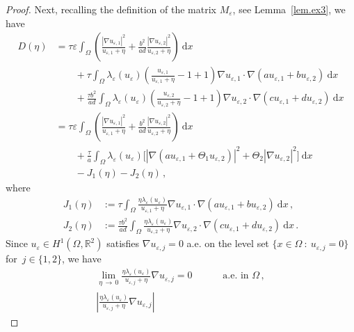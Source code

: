 \documentclass[10pt]{amsart}
\theoremstyle{definition}\newtheorem{defi}[theo]{Definition}\newtheorem{rema}[theo]{Remark}\newtheorem{exam}[theo]{Example}\newtheorem{exem}[theo]{Example}\newtheorem{nota}[theo]{Notation}
\newcommand{\bbR}{\mathbb{R}}
\newcommand{\rmd}{\mathrm{d}}
\begin{document}
\begin{proof}
Next, recalling the definition of the matrix $M_\varepsilon$, see Lemma~\ref{lem.ex3}, we have
\begin{align*}
D(\eta) & = \tau\varepsilon\int_\Omega
\left(\frac{|\nabla u_{\varepsilon,1}|^2}{u_{\varepsilon,1}+\eta} +\frac{b^2}{ad} \frac{|\nabla u_{\varepsilon,2}|^2}{u_{\varepsilon,2}+\eta} \right)\ \rmd x \\
&\qquad + \tau \int_\Omega \lambda_\varepsilon(u_{\varepsilon}) \left(\frac{u_{\varepsilon,1}}{u_{\varepsilon,1}+\eta} - 1 + 1 \right) \nabla u_{\varepsilon,1}\cdot \nabla(a u_{\varepsilon,1} +b u_{\varepsilon,2}) \ \rmd x \\
&\qquad + \frac{\tau b^2}{ad} \int_\Omega \lambda_\varepsilon(u_{\varepsilon}) \left(\frac{ u_{\varepsilon,2}}{u_{\varepsilon,2}+\eta} - 1 + 1 \right)
\nabla u_{\varepsilon,2}\cdot \nabla(c u_{\varepsilon,1} +d u_{\varepsilon,2}) \ \rmd x \\
&=\tau\varepsilon\int_\Omega \left(\frac{|\nabla u_{\varepsilon,1}|^2}{u_{\varepsilon,1}+\eta} +\frac{b^2}{ad} \frac{|\nabla u_{\varepsilon,2}|^2}{u_{\varepsilon,2}+\eta} \right)\ \rmd x \\
& \qquad + \frac{\tau}{a} \int_\Omega\lambda_\varepsilon(u_{\varepsilon}) \big[|\nabla(a u_{\varepsilon,1}+\Theta_1 u_{\varepsilon,2})|^2 + \Theta_2|\nabla u_{\varepsilon,2} |^2 \big]\ \rmd x\\
& \qquad - J_1(\eta) - J_2(\eta)\,,
\end{align*}
where
\begin{align*}
J_1(\eta) & := \tau \int_\Omega \frac{\eta\lambda_\varepsilon(u_{\varepsilon}) }{u_{\varepsilon,1}+\eta} \nabla u_{\varepsilon,1} \cdot \nabla(a u_{\varepsilon,1} + b u_{\varepsilon,2}) \ \rmd x\,, \\
J_2(\eta) & := \frac{\tau b^2}{ad} \int_\Omega \frac{\eta\lambda_\varepsilon(u_{\varepsilon}) }{u_{\varepsilon,2}+\eta} \nabla u_{\varepsilon,2} \cdot \nabla(c u_{\varepsilon,1} + d u_{\varepsilon,2}) \ \rmd x\,.
\end{align*}
Since $u_{\varepsilon}\in H^1(\Omega,\bbR^2)$ satisfies $\nabla u_{\varepsilon,j}=0$ a.e. on the level set $\{x\in\Omega\ : \ u_{\varepsilon,j}=0\}$ for~$j\in\{1,2\}$, we have
\begin{align*}
\lim_{\eta\,\to\,0} \frac{\eta\lambda_\varepsilon(u_{\varepsilon}) }{u_{\varepsilon,j}+\eta} \nabla u_{\varepsilon,j}=0\qquad &\text{ a.e. in $\Omega$}\,, \\
 \left| \frac{\eta\lambda_\varepsilon(u_{\varepsilon}) }{u_{\varepsilon,j}+\eta} \nabla u_{\varepsilon,j} \right|

\end{align*}
\end{proof}
\end{document}
